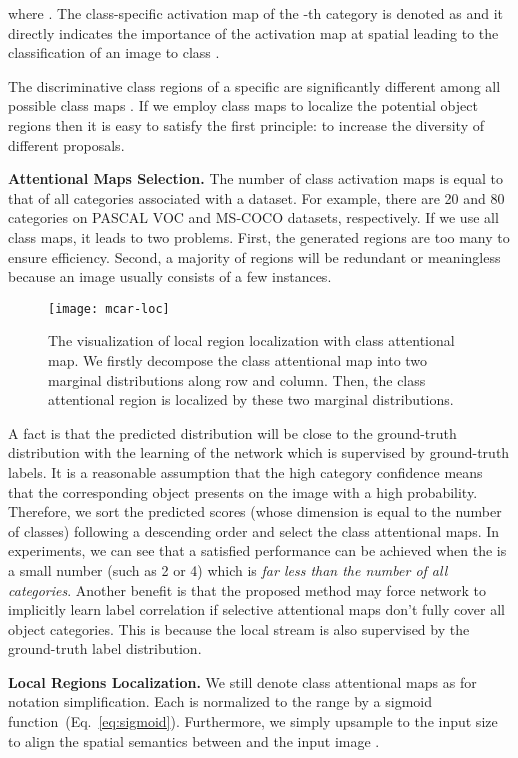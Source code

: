 \documentclass[journal]{IEEEtran}
\begin{document}
 where . The class-specific activation map of the -th category is denoted as  and it directly indicates the importance of the activation map at spatial leading to the classification of an image to class . 
  
The discriminative class regions of a specific  are significantly different among all possible class maps . If we employ class maps   to localize the potential object regions then it is easy to satisfy the first principle: to increase the diversity of different proposals.
 
\noindent \textbf{Attentional Maps Selection.} 
The number of class activation maps is equal to that of all categories associated with a dataset. For example, there are 20 and 80 categories on PASCAL VOC and MS-COCO datasets, respectively. If we use all class maps, it leads to two problems. First, the generated regions are too many to ensure efficiency. Second, a majority of regions will be redundant or meaningless because an image usually consists of a few instances.

\begin{figure}[t]
 \centering
 {\texttt{[image: mcar-loc]}}
\caption{The visualization of local region localization with class attentional map. We firstly decompose the class attentional map into two marginal distributions along row and column. Then, the class attentional region is localized by these two marginal distributions.}\label{fig:mcar}
\end{figure}


A fact is that the predicted distribution will be close to the ground-truth distribution with the learning of the network which is supervised by ground-truth labels. It is a reasonable assumption that the high category confidence means that the corresponding object presents on the image with a high probability. Therefore, we sort the predicted scores  (whose dimension is equal to the number of classes) following a descending order and select the  class attentional maps. In experiments, we can see that a satisfied performance can be achieved when the  is a small number (such as 2 or 4) which is \emph{far less than the number of all categories}. Another benefit is that the proposed method may force network to implicitly learn label correlation if selective attentional maps don't fully cover all object categories. This is because the local stream is also supervised by the ground-truth label distribution.

\noindent \textbf{Local Regions Localization.} 
We still denote  class attentional maps as  for notation simplification. Each  is normalized to the range  by a sigmoid function~(Eq.~\ref{eq:sigmoid}). Furthermore, we simply upsample   to the input size to align the spatial semantics between  and the input image .
\end{document}
